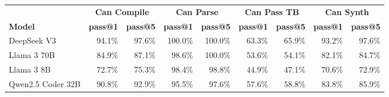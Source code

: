 \begin{tabular}{l|rr|rr|rr|rr}
\cmidrule[\heavyrulewidth]{2-9}
 & \multicolumn{2}{c|}{\textbf{Can Compile}} & \multicolumn{2}{c|}{\textbf{Can Parse}} & \multicolumn{2}{c|}{\textbf{Can Pass TB}} & \multicolumn{2}{c}{\textbf{Can Synth}} \\
\cmidrule(lr){2-3} \cmidrule(lr){4-5} \cmidrule(lr){6-7} \cmidrule(lr){8-9}
 \textbf{Model} & \textbf{pass@1} & \textbf{pass@5} & \textbf{pass@1} & \textbf{pass@5} & \textbf{pass@1} & \textbf{pass@5} & \textbf{pass@1} & \textbf{pass@5} \\
\midrule
DeepSeek V3 & 94.1\% & 97.6\% & 100.0\% & 100.0\% & 63.3\% & 65.9\% & 93.2\% & 97.6\% \\
Llama 3 70B & 84.9\% & 87.1\% & 98.6\% & 100.0\% & 53.6\% & 54.1\% & 82.1\% & 84.7\% \\
Llama 3 8B & 72.7\% & 75.3\% & 98.4\% & 98.8\% & 44.9\% & 47.1\% & 70.6\% & 72.9\% \\
Qwen2.5 Coder 32B & 90.8\% & 92.9\% & 95.5\% & 97.6\% & 57.6\% & 58.8\% & 83.8\% & 85.9\% \\
\bottomrule
\end{tabular}